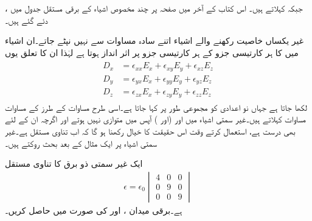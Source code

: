  ،   جبکہ     کہلاتے ہیں۔ اس کتاب کے آخر میں صفحہ  پر  چند مخصوص اشیاء کے برقی مستقل جدول  میں دئے گئے ہیں۔

غیر یکساں خاصیت رکھنے والے اشیاء اتنے سادہ مساوات سے نہیں نپٹے جاتے۔ان اشیاء میں  کا ہر کارتیسی جزو    کے ہر کارتیسی جزو پر اثر انداز ہوتا ہے لہٰذا ان کا تعلق یوں
\begin{gather}
\begin{aligned}\label{مساوت_کپیسٹر_تناوی-مساوات}
D_x&=\epsilon_{xx} E_x +\epsilon_{xy} E_y+\epsilon_{xz} E_z\\
D_y&=\epsilon_{yx} E_x +\epsilon_{yy} E_y+\epsilon_{yz} E_z\\
D_z&=\epsilon_{zx} E_x +\epsilon_{zy} E_y+\epsilon_{zz} E_z
\end{aligned}
\end{gather}
لکھا جاتا ہے جہاں نو اعدادی  کو مجموعی طور پر  کہا جاتا ہے۔اسی طرح مساوات  کے طرز کے مساوات  مساوات کہلاتے ہیں۔غیر سمتی اشیاء میں  اور   (اور ) آپس میں متوازی نہیں  ہوتے اور اگرچہ  ان کے لئے بھی درست ہے،  استعمال کرتے وقت  اس حقیقت کا خیال رکھنا ہو گا کہ  اب تناوی مستقل ہے۔غیر سمتی اشیاء پر ایک مثال کے بعد بحث روکتے ہیں۔

ایک غیر سمتی ذو برق کا تناوی مستقل
\begin{align*}
\epsilon=\epsilon_0 
\begin{vmatrix}
4 & 0 & 0 \\
0 & 9 & 0\\
0 & 0 &9
\end{vmatrix}
\end{align*}
ہے۔برقی میدان ،  اور  کی صورت میں  حاصل کریں۔


